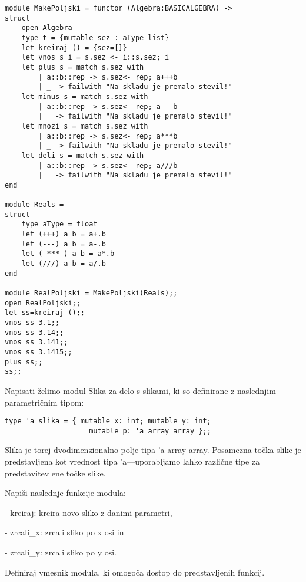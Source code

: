\begin{ex}
\begin{sol}
\begin{lstlisting}
module MakePoljski = functor (Algebra:BASICALGEBRA) ->
struct
    open Algebra
    type t = {mutable sez : aType list}
    let kreiraj () = {sez=[]}
    let vnos s i = s.sez <- i::s.sez; i
    let plus s = match s.sez with
        | a::b::rep -> s.sez<- rep; a+++b
        | _ -> failwith "Na skladu je premalo stevil!"
    let minus s = match s.sez with
        | a::b::rep -> s.sez<- rep; a---b
        | _ -> failwith "Na skladu je premalo stevil!"
    let mnozi s = match s.sez with
        | a::b::rep -> s.sez<- rep; a***b
        | _ -> failwith "Na skladu je premalo stevil!"
    let deli s = match s.sez with
        | a::b::rep -> s.sez<- rep; a///b
        | _ -> failwith "Na skladu je premalo stevil!"
end

module Reals =
struct
    type aType = float
    let (+++) a b = a+.b
    let (---) a b = a-.b
    let ( *** ) a b = a*.b
    let (///) a b = a/.b
end

module RealPoljski = MakePoljski(Reals);;
open RealPoljski;;
let ss=kreiraj ();;
vnos ss 3.1;;
vnos ss 3.14;;
vnos ss 3.141;;
vnos ss 3.1415;;
plus ss;;
ss;;
\end{lstlisting}

\end{sol}

\end{ex}



\begin{ex}
Napisati \v zelimo modul Slika za delo s slikami, ki so definirane z naslednjim parametri\v cnim tipom:

\begin{lstlisting}
type 'a slika = { mutable x: int; mutable y: int;
					mutable p: 'a array array };; 
\end{lstlisting}

Slika je torej dvodimenzionalno polje tipa 'a array array. Posamezna to\v cka slike je predstavljena kot vrednost tipa 'a---uporabljamo lahko razli\v cne tipe za predstavitev ene to\v cke slike.

Napi\v si naslednje funkcije modula:

- kreiraj: kreira novo sliko z danimi parametri,

- zrcali\_x: zrcali sliko po x osi in

- zrcali\_y: zrcali sliko po y osi.

Definiraj vmesnik modula, ki omogo\v ca dostop do predstavljenih funkcij.
\end{ex}



